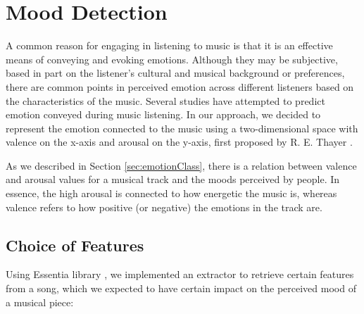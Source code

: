 \vspace{20pt}

\section{Mood Detection}

A common reason for engaging in listening to music is that it is an effective means of conveying and evoking emotions. Although they may be subjective, based in part on the listener’s cultural and musical background or preferences, there are common points in perceived emotion across different listeners based on the characteristics of the music. Several studies have attempted to predict emotion conveyed during music listening. In our approach, we decided to represent the emotion connected to the music using a two-dimensional space with valence on the x-axis and arousal on the y-axis, first proposed by R. E. Thayer \cite{Thayer}.

As we described in Section \ref{sec:emotionClass}, there is a relation between valence and arousal values for a musical track and the moods perceived by people. In essence, the high arousal is connected to how energetic the music is, whereas valence refers to how positive (or negative) the emotions in the track are. 

\vspace{10pt}

\subsection{Choice of Features}
Using Essentia library \cite{essentia}, we implemented an extractor to retrieve certain features from a song, which we expected to have certain impact on the perceived mood of a musical piece:

